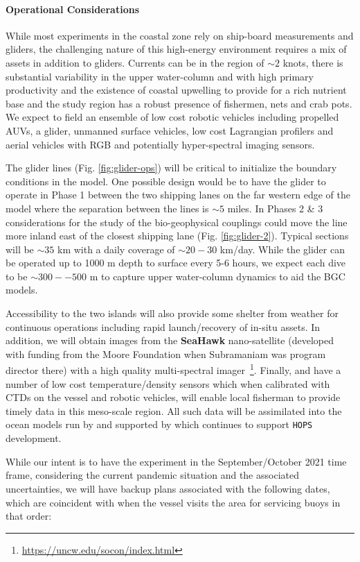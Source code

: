 \paragraph{Operational Considerations} While most experiments in the
coastal zone rely on ship-board measurements and gliders, the
challenging nature of this high-energy environment requires a mix of
assets in addition to gliders. Currents can be in the region of
$\sim 2$ knots, there is substantial variability in the upper
water-column and with high primary productivity and the existence of
coastal upwelling to provide for a rich nutrient base and the study
region has a robust presence of fishermen, nets and crab pots. We
expect to field an ensemble of low cost robotic vehicles including
propelled AUVs, a glider, unmanned surface vehicles, low cost
Lagrangian profilers and aerial vehicles with RGB and potentially
hyper-spectral imaging sensors. 

The glider lines (Fig. \ref{fig:glider-ops}) will be critical to
initialize the boundary conditions in the model. One possible design
would be to have the glider to operate in Phase 1 between the two
shipping lanes on the far western edge of the model where the
separation between the lines is $\sim 5$ miles. In Phases 2 \& 3
considerations for the study of the bio-geophysical couplings could
move the line more inland east of the closest shipping lane
(Fig. \ref{fig:glider-2}). Typical sections will be $\sim 35$ km with
a daily coverage of $\sim 20-30$ km/day. While the glider can be
operated up to 1000 m depth to surface every 5-6 hours, we expect each
dive to be $\sim 300--500$ m to capture upper water-column dynamics to
aid the BGC models. 

Accessibility to the two islands will also provide some shelter from
weather for continuous operations including rapid launch/recovery of
in-situ assets. In addition, we will obtain images from the
\textbf{SeaHawk} nano-satellite (developed with funding from the Moore
Foundation when Subramaniam was program director there) with a high
quality multi-spectral
imager~\footnote{\url{https://uncw.edu/socon/index.html}}. Finally,
\univ and \inst have a number of low cost temperature/density sensors
which when calibrated with CTDs on the vessel and robotic vehicles,
will enable local fisherman to provide timely data in this meso-scale
region. All such data will be assimilated into the ocean models run by
\inst and supported by \mit which continues to support \texttt{HOPS}
development.

While our intent is to have the experiment in the September/October 2021
time frame, considering the current pandemic situation and the
associated uncertainties, we will have backup plans associated with the
following dates, which are coincident with when the \inst vessel visits
the \naz area for servicing buoys in that order:

